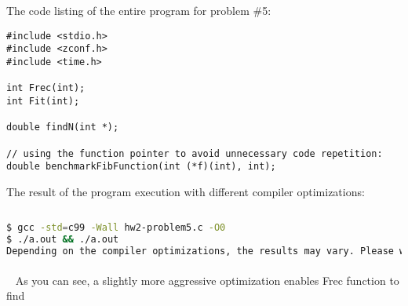 \documentclass{article}
\begin{document}
		\noindent The code listing of the entire program for problem \#5: 
		\begin{verbatim}
#include <stdio.h>
#include <zconf.h>
#include <time.h>

int Frec(int);
int Fit(int);

double findN(int *);

// using the function pointer to avoid unnecessary code repetition:
double benchmarkFibFunction(int (*f)(int), int);

		\end{verbatim}
		
		
	\rmfamily
	\noindent The result of the program execution with different compiler optimizations:
	
	\ttfamily
	\begin{lstlisting}[language=bash]
	
$ gcc -std=c99 -Wall hw2-problem5.c -O0
$ ./a.out && ./a.out
Depending on the compiler optimizations, the results may vary. Please wait...

	\end{lstlisting}
	

	\paragraph{}\
	\rmfamily
	As you can see, a slightly more aggressive optimization enables Frec function to find
		
\end{document}
